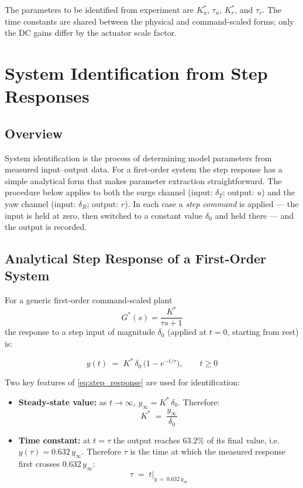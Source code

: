 \documentclass[../../book.tex]{subfiles}
\begin{document}
The parameters to be identified from experiment are $K_u^*$, $\tau_u$,
$K_r^*$, and $\tau_r$.  The time constants are shared between the physical
and command-scaled forms; only the DC gains differ by the actuator scale
factor.

\section{System Identification from Step Responses}
\label{sec:sysid}

\subsection{Overview}

System identification is the process of determining model parameters from
measured input--output data.  For a first-order system the step response
has a simple analytical form that makes parameter extraction
straightforward.  The procedure below applies to both the surge channel
(input: $\delta_T$; output: $u$) and the yaw channel (input: $\delta_R$;
output: $r$).  In each case a \emph{step command} is applied --- the input
is held at zero, then switched to a constant value $\delta_0$ and held
there --- and the output is recorded.

\subsection{Analytical Step Response of a First-Order System}

For a generic first-order command-scaled plant
\[
  G^*(s) = \frac{K^*}{\tau s + 1}
\]
the response to a step input of magnitude $\delta_0$ (applied at $t=0$,
starting from rest) is:

\begin{equation}
  y(t) \;=\; K^*\,\delta_0\,\bigl(1 - e^{-t/\tau}\bigr), \qquad t \geq 0
  \label{eq:step_response}
\end{equation}

Two key features of \eqref{eq:step_response} are used for identification:

\begin{itemize}
  \item \textbf{Steady-state value:} as $t \to \infty$,
        $y_\infty = K^*\,\delta_0$.  Therefore:
        \begin{equation}
          K^* \;=\; \frac{y_\infty}{\delta_0}
          \label{eq:K_id}
        \end{equation}

  \item \textbf{Time constant:} at $t = \tau$ the output reaches
        $63.2\%$ of its final value, i.e.\ $y(\tau) = 0.632\,y_\infty$.
        Therefore $\tau$ is the time at which the measured response first
        crosses $0.632\,y_\infty$:
        \begin{equation}
          \tau \;=\; t\big|_{y\,=\,0.632\,y_\infty}
          \label{eq:tau_id}
        \end{equation}
\end{itemize}
\end{document}
